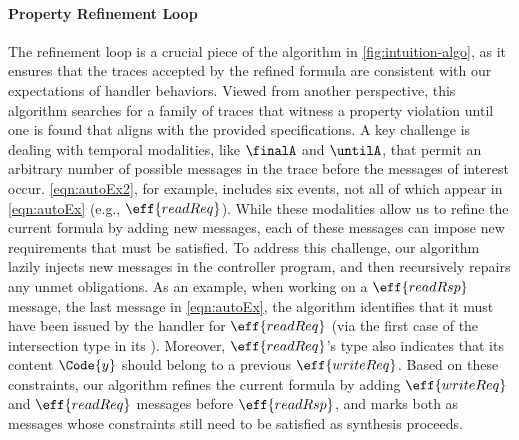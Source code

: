 \paragraph{Property Refinement Loop}
The refinement loop is a crucial piece of the algorithm in
\autoref{fig:intuition-algo}, as it ensures that the traces accepted
by the refined formula are consistent with our expectations of handler
behaviors. Viewed from another perspective, this algorithm searches
for a family of traces that witness a property violation until one is
found that aligns with the provided specifications. A key challenge is
dealing with temporal modalities, like $\finalA$ and $\untilA$, that
permit an arbitrary number of possible messages in the trace before
the messages of interest occur. \ref{eqn:autoEx2}, for example,
includes six events, not all of which appear in \ref{eqn:autoEx}
(e.g., $\eff{readReq}$). While these modalities allow us to refine the
current formula by adding new messages, each of these messages can
impose new requirements that must be satisfied. To address this
challenge, our algorithm lazily injects new messages in the controller
program, and then recursively repairs any unmet obligations.  As an
example, when working on a $\eff{readRsp}$ message, the last message
in \ref{eqn:autoEx}, the algorithm identifies that it must have been
issued by the handler for $\eff{readReq}$ (via the first case of the
intersection type in its \PAT{}). Moreover, $\eff{readReq}$'s type
also indicates that its content $\Code{y}$ should belong to a previous
$\eff{writeReq}$.  Based on these constraints, our algorithm refines
the current formula by adding $\eff{writeReq}$ and $\eff{readReq}$
messages before $\eff{readRsp}$, and marks both as messages whose
constraints still need to be satisfied as synthesis proceeds.


